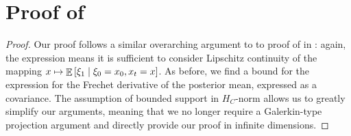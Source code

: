 \section{Proof of }\label{prf:lem:manifold}

\restatelemmanifold*
\begin{proof}
  Our proof follows a similar overarching argument to to proof of  in : again, the expression  means it is sufficient to consider Lipschitz continuity of the mapping \(x\mapsto \mathop{\mathbb{E}}\qty[\xi_{1} \mid \xi_{0} = x_{0}, x_{t} = x]\). As before, we find a bound for the expression for the Frechet derivative of the posterior mean, expressed as a covariance. The assumption of bounded support in \(H_{C}\)-norm allows us to greatly simplify our arguments, meaning that we no longer require a Galerkin-type projection argument and directly provide our proof in infinite dimensions.



\end{proof}
